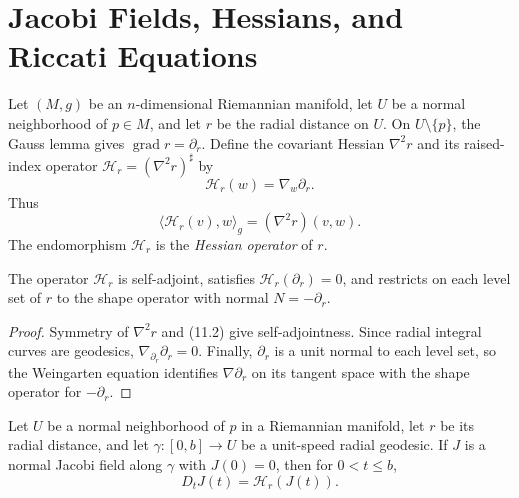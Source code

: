\section{Jacobi Fields, Hessians, and Riccati Equations}

Let $(M,g)$ be an $n$-dimensional Riemannian manifold, let $U$ be a normal
neighborhood of $p\in M$, and let $r$ be the radial distance on $U$.  On
$U\setminus\{p\}$, the Gauss lemma gives $\operatorname{grad}r=\partial_r$.
Define the covariant Hessian $\nabla^2r$ and its raised-index operator
$\mathcal H_r=(\nabla^2r)^\sharp$ by
\begin{equation}
\mathcal H_r(w)=\nabla_w\partial_r. \tag{11.1}
\end{equation}
Thus
\begin{equation}
\langle\mathcal H_r(v),w\rangle_g=(\nabla^2r)(v,w). \tag{11.2}
\end{equation}
The endomorphism $\mathcal H_r$ is the \emph{Hessian operator} of $r$.

\begin{lemma}
\label{lem:hessian-operator-properties}

The operator $\mathcal H_r$ is self-adjoint, satisfies
$\mathcal H_r(\partial_r)=0$, and restricts on each level set of $r$ to the
shape operator with normal $N=-\partial_r$.
\end{lemma}

\begin{proof}
\sketch
Symmetry of $\nabla^2r$ and (11.2) give self-adjointness.  Since radial integral
curves are geodesics, $\nabla_{\partial_r}\partial_r=0$.  Finally,
$\partial_r$ is a unit normal to each level set, so the Weingarten equation
identifies $\nabla\partial_r$ on its tangent space with the shape operator for
$-\partial_r$.
\end{proof}

\begin{proposition}
\label{prop:jacobi-field-hessian-equation}

Let $U$ be a normal neighborhood of $p$ in a Riemannian manifold, let
$r$ be its radial distance, and let $\gamma:[0,b]\to U$ be a unit-speed radial
geodesic.  If $J$ is a normal Jacobi field along $\gamma$ with $J(0)=0$, then
for $0<t\leq b$,
\begin{equation}
D_tJ(t)=\mathcal H_r(J(t)). \tag{11.3}
\end{equation}
\end{proposition}

